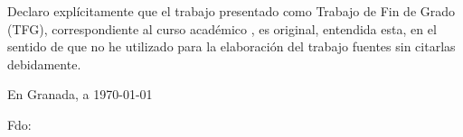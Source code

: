 %

\thispagestyle{empty}

\hfill\vfill



Declaro explícitamente que el trabajo presentado como Trabajo de Fin de Grado (TFG), correspondiente al curso académico \miCurso, es original, entendida esta, en el sentido de que no he utilizado para la elaboración del trabajo fuentes sin citarlas debidamente.
\medskip

En Granada, a \today 
\begin{flushleft} 
Fdo: \miNombre 

\end{flushleft}

\vfill

\cleardoublepage
\endinput

